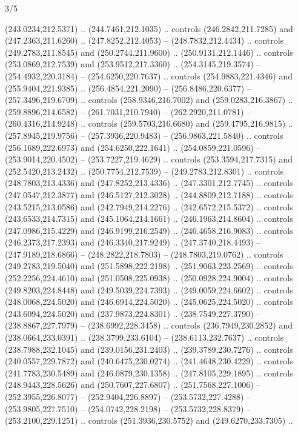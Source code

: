 \begin{flagdescription}{3/5}
\begin{scope}[xshift=0.5\flaglength,yshift=0.5\flagwidth,scale=\flagwidth/270]
\begin{scope}[y=0.8pt, x=0.8pt, yscale=-1,shift={(-281.25,-168.75)}]
  (243.0234,212.5371) .. (244.7461,212.1035) .. controls (246.2842,211.7285) and
  (247.2363,211.6260) .. (247.8252,212.4053) -- (248.7832,212.4434) .. controls
  (249.2783,211.8545) and (250.2744,211.9600) .. (250.9131,212.1446) .. controls
  (253.0869,212.7539) and (253.9512,217.3360) .. (254.3145,219.3574) --
  (254.4932,220.3184) -- (254.6250,220.7637) .. controls (254.9883,221.4346) and
  (255.9404,221.9385) .. (256.4854,221.2090) -- (256.8486,220.6377) --
  (257.3496,219.6709) .. controls (258.9346,216.7002) and (259.0283,216.3867) ..
  (259.8896,214.6582) -- (261.7031,210.7940) -- (262.2920,211.0781) --
  (260.4316,214.9248) .. controls (259.5703,216.6680) and (259.4795,216.9815) ..
  (257.8945,219.9756) -- (257.3936,220.9483) -- (256.9863,221.5840) .. controls
  (256.1689,222.6973) and (254.6250,222.1641) .. (254.0859,221.0596) --
  (253.9014,220.4502) -- (253.7227,219.4629) .. controls (253.3594,217.7315) and
  (252.5420,213.2432) .. (250.7754,212.7539) -- (249.2783,212.8301) .. controls
  (248.7803,213.4336) and (247.8252,213.4336) .. (247.3301,212.7745) .. controls
  (247.0547,212.3877) and (246.5127,212.3028) .. (244.8809,212.7188) .. controls
  (243.5215,213.0586) and (242.7949,214.2276) .. (242.6572,215.5372) .. controls
  (243.6533,214.7315) and (245.1064,214.1661) .. (246.1963,214.8604) .. controls
  (247.0986,215.4229) and (246.9199,216.2549) .. (246.4658,216.9083) .. controls
  (246.2373,217.2393) and (246.3340,217.9249) .. (247.3740,218.4493) --
  (247.9189,218.6866) -- (248.2822,218.7803) -- (248.7803,219.0762) .. controls
  (249.2783,219.5040) and (251.5898,222.2198) .. (251.9063,223.2569) .. controls
  (252.2256,224.4610) and (251.0508,225.0938) .. (250.0928,224.9004) .. controls
  (249.8203,224.8448) and (249.5039,224.7393) .. (249.0059,224.6602) .. controls
  (248.0068,224.5020) and (246.6914,224.5020) .. (245.0625,224.5020) .. controls
  (243.6094,224.5020) and (237.9873,224.8301) .. (238.7549,227.3790) --
  (238.8867,227.7979) -- (238.6992,228.3458) .. controls (236.7949,230.2852) and
  (238.0664,233.0391) .. (238.3799,233.6104) -- (238.6113,232.7637) .. controls
  (238.7988,232.1045) and (239.0156,231.2403) .. (239.3789,230.7276) .. controls
  (240.0557,229.7872) and (240.6475,230.0274) .. (241.4648,230.4229) .. controls
  (241.7783,230.5489) and (246.0879,230.1358) .. (247.8105,229.1895) .. controls
  (248.9443,228.5626) and (250.7607,227.6807) .. (251.7568,227.1006) --
  (252.3955,226.8077) -- (252.9404,226.8897) -- (253.5732,227.4288) --
  (253.9805,227.7510) -- (254.0742,228.2198) -- (253.5732,228.8379) --
  (253.2100,229.1251) .. controls (251.3936,230.5752) and (249.6270,233.7305) ..

\end{scope}
\end{scope}
\end{flagdescription}
